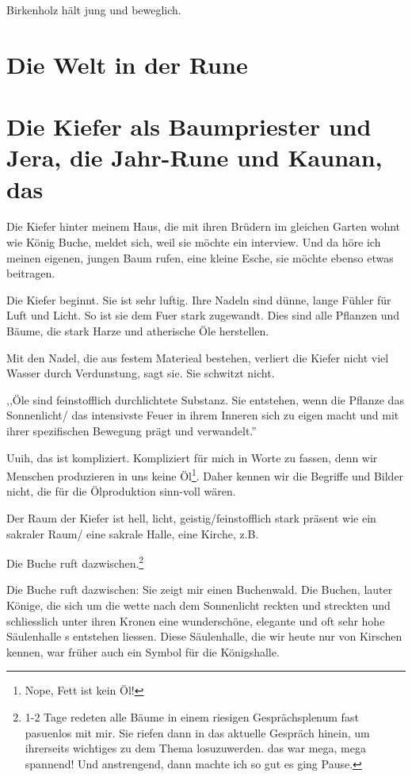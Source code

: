\documentclass[11pt,titlepage,a5paper]{book}
\begin{document}
Birkenholz hält jung und beweglich.


\section*{Die Welt in der Rune \textarc{[\withlines]} }

\section*{Die Kiefer als Baumpriester und Jera, die Jahr-Rune  und Kaunan, das   }

Die Kiefer hinter meinem Haus, die mit ihren Brüdern im gleichen Garten wohnt wie König Buche, meldet sich, weil sie möchte ein interview. Und da höre ich meinen eigenen, jungen Baum rufen, eine kleine Esche, sie möchte ebenso etwas beitragen.

Die Kiefer beginnt. Sie ist sehr luftig. Ihre Nadeln sind dünne, lange Fühler für Luft und Licht. So ist sie dem Fuer stark zugewandt. Dies sind alle Pflanzen und Bäume, die stark Harze und atherische Öle herstellen.

Mit den Nadel, die aus festem Materieal bestehen, verliert die Kiefer nicht viel Wasser durch Verdunstung, sagt sie. Sie schwitzt nicht.

,,Öle sind feinstofflich durchlichtete Substanz. Sie entstehen, wenn die Pflanze das Sonnenlicht/ das intensivste Feuer in ihrem Inneren sich zu eigen macht und mit ihrer spezifischen Bewegung prägt und verwandelt.''

Uuih, das ist kompliziert. Kompliziert für mich in Worte zu fassen, denn wir Menschen produzieren in uns keine Öl\footnote{Nope, Fett ist kein Öl!}. Daher kennen wir die Begriffe und Bilder nicht, die für die Ölproduktion sinn-voll wären.

Der Raum der Kiefer ist hell, licht, geistig/feinstofflich stark präsent wie ein sakraler Raum/ eine sakrale Halle, eine Kirche, z.B.

Die Buche ruft dazwischen.\footnote{1-2 Tage redeten alle Bäume in einem riesigen Gesprächsplenum fast pasuenlos mit mir. Sie riefen dann in das aktuelle Gespräch hinein, um ihrerseits wichtiges zu dem Thema losuzuwerden. das war mega, mega spannend! Und anstrengend, dann machte ich so gut es ging Pause.}

Die Buche ruft dazwischen: Sie zeigt mir einen Buchenwald. Die Buchen, lauter Könige, die sich um die wette nach dem Sonnenlicht reckten und streckten und schliesslich unter ihren Kronen eine wunderschöne, elegante und oft sehr hohe Säulenhalle s
entstehen liessen. Diese Säulenhalle, die wir heute nur von Kirschen kennen, war früher auch ein Symbol für die Königshalle.
\end{document}
